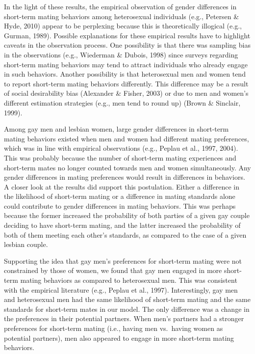 \documentclass[
  11pt,
]{article}
\begin{document}
In the light of these results, the empirical observation of gender
differences in short-term mating behaviors among heterosexual
individuals (e.g., Petersen \& Hyde, 2010) appear to be perplexing
because this is theoretically illogical (e.g., Gurman, 1989). Possible
explanations for these empirical results have to highlight caveats in
the observation process. One possibility is that there was sampling bias
in the observations (e.g., Wiederman \& Dubois, 1998) since surveys
regarding short-term mating behaviors may tend to attract individuals
who already engage in such behaviors. Another possibility is that
heterosexual men and women tend to report short-term mating behaviors
differently. This difference may be a result of social desirability bias
(Alexander \& Fisher, 2003) or due to men and women's different
estimation strategies (e.g., men tend to round up) (Brown \& Sinclair,
1999).

Among gay men and lesbian women, large gender differences in short-term
mating behaviors existed when men and women had different mating
preferences, which was in line with empirical observations (e.g., Peplau
et al., 1997, 2004). This was probably because the number of short-term
mating experiences and short-term mates no longer counted towards men
and women simultaneously. Any gender differences in mating preferences
would result in differences in behaviors. A closer look at the results
did support this postulation. Either a difference in the likelihood of
short-term mating or a difference in mating standards alone could
contribute to gender differences in mating behaviors. This was perhaps
because the former increased the probability of both parties of a given
gay couple deciding to have short-term mating, and the latter increased
the probability of both of them meeting each other's standards, as
compared to the case of a given lesbian couple.

Supporting the idea that gay men's preferences for short-term mating
were not constrained by those of women, we found that gay men engaged in
more short-term mating behaviors as compared to heterosexual men. This
was consistent with the empirical literature (e.g., Peplau et al.,
1997). Interestingly, gay men and heterosexual men had the same
likelihood of short-term mating and the same standards for short-term
mates in our model. The only difference was a change in the preferences
in their potential partners. When men's partners had a stronger
preferences for short-term mating (i.e., having men vs.~having women as
potential partners), men also appeared to engage in more short-term
mating behaviors.
\end{document}

